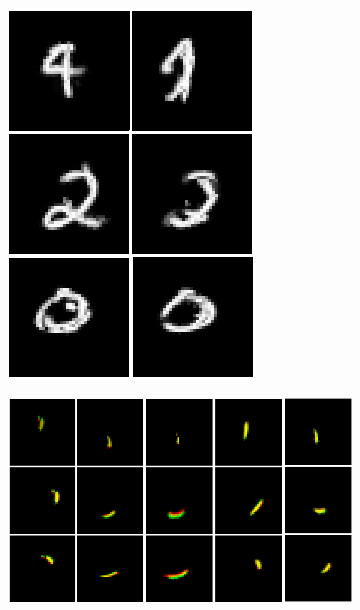 \begin{figure}
\begin{subfigure}[c]{.0295\linewidth}
        \caption{}
    \end{subfigure}
    \hfill
    \begin{subfigure}[c]{.09\linewidth}
        \includegraphics[width=\linewidth]{figures/SCA/mnist/caps_recs}
        \caption{}
    \end{subfigure}
    \hfill
    \begin{subfigure}[c]{.225\linewidth}
        \includegraphics[width=\linewidth]{figures/SCA/mnist/transformed_templates}

\end{subfigure}
\end{figure}
